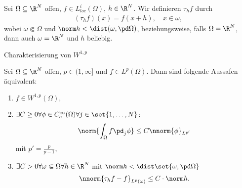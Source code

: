 Sei $\Omega \subseteq \R^{N}$ offen, $f \in L^{i}_{loc}(\Omega)$, $h \in \R^{N}$. Wir definieren $\tau_{h}f$ durch
\begin{align*}
  (\tau_{h}f)(x) = f(x + h), \quad x \in \omega, 
\end{align*}
wobei $\omega \Subset \Omega$ und $\norm h < \dist(\omega, \pd \Omega)$, beziehungsweise, falls $\Omega = \R^{N}$, dann auch $\omega = \R^{N}$ und $h$ beliebig. 

\begin{theorem} Charakterisierung von $W^{1, p}$

Sei $\Omega\subseteq \R^{N}$ offen, $p \in (1, \infty]$ und $f \in L^{p}(\Omega)$. Dann sind folgende Aussafen äquivalent:
\begin{enumerate}
\item\label{num:1} $f \in W^{1, p}(\Omega)$,
\item\label{num:2} $\exists C\geq0 \forall \phi \in C_{c}^{\infty}(\Omega)\forall j \in \set{1, \dots, N}$:
  \begin{align*}
    \norm{\int_{\Omega} f \pd_{j}\phi} \leq C \nnorm{\phi}_{L^{p'}}
  \end{align*}
mit $p' = \frac{p}{p-1}$,
\item\label{num:3} $\exists C>0 \forall\omega \Subset \Omega\forall h \in \R^{N}$ mit $\norm h < \dist\set{\omega, \pd \Omega}$
  \begin{align*}
    \nnorm{\tau_{h}f-f}_{L^{p}(\omega)}\leq C\cdot\norm h. 
  \end{align*}
\end{enumerate}
\end{theorem}

